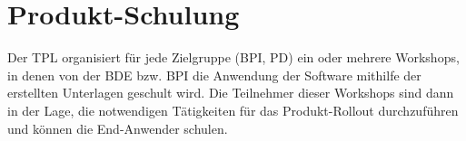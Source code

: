 \section{Produkt-Schulung}

Der \ac{TPL} organisiert für jede Zielgruppe (\ac{BPI}, \ac{PD}) ein oder mehrere Workshops, in denen von der \ac{BDE} bzw. \ac{BPI} die Anwendung der Software mithilfe der erstellten Unterlagen geschult wird. Die Teilnehmer dieser Workshops sind dann in der Lage, die notwendigen Tätigkeiten für das Produkt-Rollout durchzuführen und können die End-Anwender schulen.



\chapterend